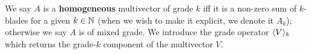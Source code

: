 \begin{definition}[Grade]\label{d:grade}
	We say $A$ is a \textbf{homogeneous} multivector of grade $k$ iff it is a non-zero sum of $k$-blades for a given $k \in \mathbb{N}$ (when we wish to make it explicit, we denote it $A_k$); otherwise we say $A$ is of mixed grade. We introduce the grade operator $\langle V \rangle_{k}$ which returns the grade-$k$ component of the multivector $V$.
\end{definition}
